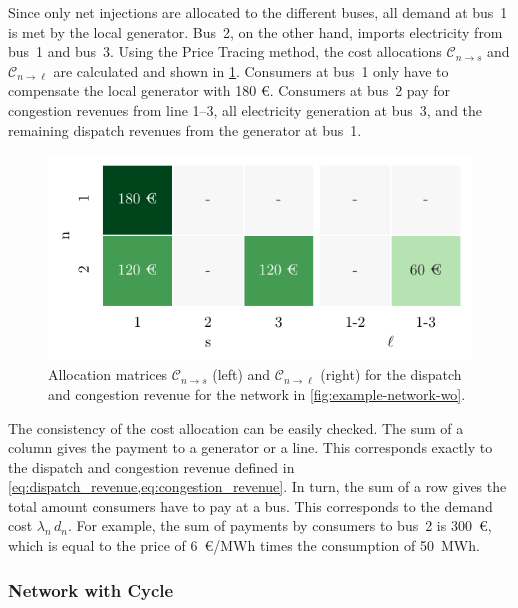 \documentclass[11pt,twocolumn]{article}
\begin{document}
Since only net injections are allocated to the different buses, all demand at bus~1 is met by the local generator. Bus~2, on the other hand, imports electricity from bus~1 and bus~3. Using the Price Tracing method, the cost allocations $\mathcal{C}_{n\rightarrow s}$ and $\mathcal{C}_{n\rightarrow \ell}$ are calculated and shown in \cref{fig:example-network-payoff-wo}. Consumers at bus~1 only have to compensate the local generator with 180 \euro. Consumers at bus~2 pay for congestion revenues from line 1--3, all electricity generation at bus~3, and the remaining dispatch revenues from the generator at bus~1.

\begin{figure}[h]
    \includegraphics[width=\linewidth]{example-without-cycles/payoff}
    \caption{Allocation matrices $\mathcal{C}_{n\rightarrow s}$ (left) and $\mathcal{C}_{n\rightarrow \ell}$ (right) for the dispatch and congestion revenue for the network in \cref{fig:example-network-wo}.}
    \label{fig:example-network-payoff-wo}
\end{figure}

The consistency of the cost allocation can be easily checked. The sum of a column gives the payment to a generator or a line. This corresponds exactly to the dispatch and congestion revenue defined in \cref{eq:dispatch_revenue,eq:congestion_revenue}. In turn, the sum of a row gives the total amount consumers have to pay at a bus. This corresponds to the demand cost $\lambda_n \, d_n$. For example, the sum of payments by consumers to bus~2 is 300~\euro, which is equal to the price of 6~\euro/MWh times the consumption of 50~MWh. \\


\subsubsection*{Network with Cycle}
\end{document}
